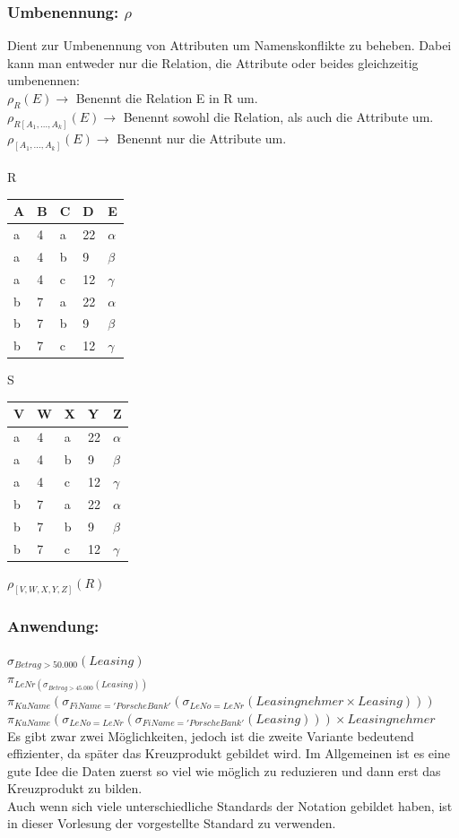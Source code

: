 \documentclass{article}
\begin{document}
 	\subsubsection{Umbenennung: \texorpdfstring{$\rho$}{}}
 	Dient zur Umbenennung von Attributen um Namenskonflikte zu beheben. Dabei kann man entweder nur die Relation, die Attribute oder beides gleichzeitig umbenennen: \\
 	$\rho_R(E) \to$ Benennt die Relation E in R um. \\
 	$\rho_{R[A_1,...,A_k]}(E) \to$ Benennt sowohl die Relation, als auch die Attribute um. \\
 	$\rho_{[A_1,...,A_k]}(E) \to$ Benennt nur die Attribute um. \\ \\
 	R
 	\begin{tabular}{| l | l | l | l | l |}
 		\toprule
 		A & B & C & D & E  \\ \midrule
 		a & 4 & a & 22 & $\alpha$  \\
 		a & 4 & b & 9 & $\beta$ \\
 		a & 4 & c & 12 & $\gamma$ \\
 		b & 7 & a & 22 & $\alpha$ \\
 		b & 7 & b & 9 & $\beta$ \\
 		b & 7 & c & 12 & $\gamma$ \\
 		\bottomrule
 	\end{tabular} \hspace{0.5cm} S
 	\begin{tabular}{| l | l | l | l | l |}
 		\toprule
 		V & W & X & Y & Z  \\ \midrule
 		a & 4 & a & 22 & $\alpha$  \\
 		a & 4 & b & 9 & $\beta$ \\
 		a & 4 & c & 12 & $\gamma$ \\
 		b & 7 & a & 22 & $\alpha$ \\
 		b & 7 & b & 9 & $\beta$ \\
 		b & 7 & c & 12 & $\gamma$ \\
 		\bottomrule
 	\end{tabular}
 	$\rho_{[V, W, X, Y, Z]}(R)$
 	\subsubsection{Anwendung:}
 	$\sigma_{Betrag > 50.000}(Leasing)$ \\
 	$\pi_{LeNr(\sigma_{Betrag > 45.000}(Leasing))}$ \\
 	$\pi_{KuName}(\sigma_{FiName='Porsche Bank'}(\sigma_{LeNo=LeNr}(Leasingnehmer \times Leasing)))$ \\
 	$\pi_{KuName}(\sigma_{LeNo=LeNr}(\sigma_{FiName='Porsche Bank'}(Leasing)))\times Leasingnehmer$ \\
 	Es gibt zwar zwei Möglichkeiten, jedoch ist die zweite Variante bedeutend effizienter, da später das Kreuzprodukt gebildet wird. Im Allgemeinen ist es eine gute Idee die Daten zuerst so viel wie möglich zu reduzieren und dann erst das Kreuzprodukt zu bilden. \\
 	Auch wenn sich viele unterschiedliche Standards der Notation gebildet haben, ist in dieser Vorlesung der vorgestellte Standard zu verwenden.
\end{document}
